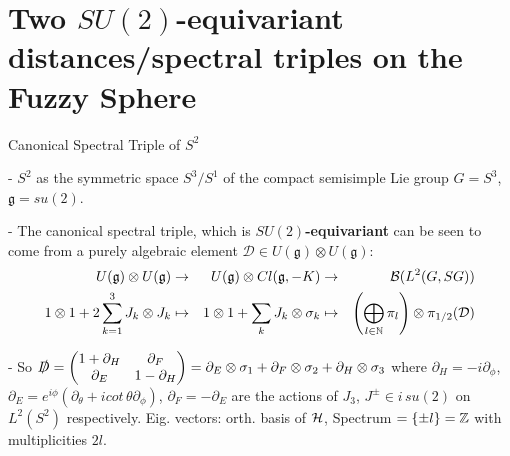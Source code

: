 \section{Two $SU(2)$-equivariant distances/spectral triples on the Fuzzy Sphere}

\begin{frame}{Canonical Spectral Triple of $S^2$} %


- $S^2$ as the symmetric space $S^3/S^1$ of the compact semisimple Lie group $G = S^3$, $\mathfrak g = su(2)$.
    
- The canonical spectral triple, which is \textbf{$SU(2)$-equivariant} can be seen to come from a purely algebraic element $\mathcal D \in U(\mathfrak g) \otimes U(\mathfrak g)$:
    \begin{align*}
        U(\mathfrak g) \otimes U(\mathfrak g) &\to& U(\mathfrak g) \otimes Cl(\mathfrak g, -K) &\to& \mathcal B(L^2(G, SG)) \\
        1 \otimes 1 + 2 \sum_{k = 1}^3 J_k \otimes J_k &\mapsto& 1 \otimes 1 + \sum_k J_k \otimes \sigma_k &\mapsto& \left( \bigoplus_{l\in \mathbb N} \pi_l \right) \otimes \pi_{1/2}(\mathcal D)
    \end{align*}
    

- So $\slashed D = \begin{pmatrix} 1 + \partial_H & \partial_F \\ \partial_E & 1 - \partial_H\end{pmatrix} = \partial_E \otimes \sigma_1 + \partial_F \otimes \sigma_2 + \partial_H \otimes \sigma_3$ where $\partial_H = -i \partial_\phi$, $\partial_E = e^{i\phi} \left( \partial_\theta + i cot\,\theta \partial_\phi \right)$, $\partial_F = -\partial_E%
$ are the actions of $J_3$, $J^\pm \in i\,su(2)$ on $L^2(S^2)$ respectively. Eig. vectors: orth. basis of $\mathcal H$, Spectrum $= \{\pm l\} = \mathbb Z$ with multiplicities $2l$.%

\end{frame}


